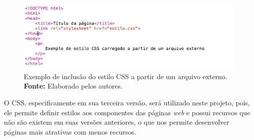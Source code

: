 \begin{itemize}
	\newpage
	\begin{figure}[h!]
		\centerline{\includegraphics[scale=0.8]{./imagens/example_external_css.png}}
		\caption[Exemplo de inclusão do estilo CSS a partir de um arquivo externo]
		{Exemplo de inclusão do estilo CSS a partir de um arquivo externo. \textbf{Fonte:} Elaborado pelos autores.}
		\label{fig:exemplo1}
	\end{figure}
	
\end{itemize}

O CSS, especificamente em sua terceira versão, será utilizado neste projeto, pois, ele permite definir estilos aos componentes das páginas \textit{web} e possui recursos que não são existem em suas versões anteriores, o que nos permite desenvolver páginas mais atrativas com menos recursos.